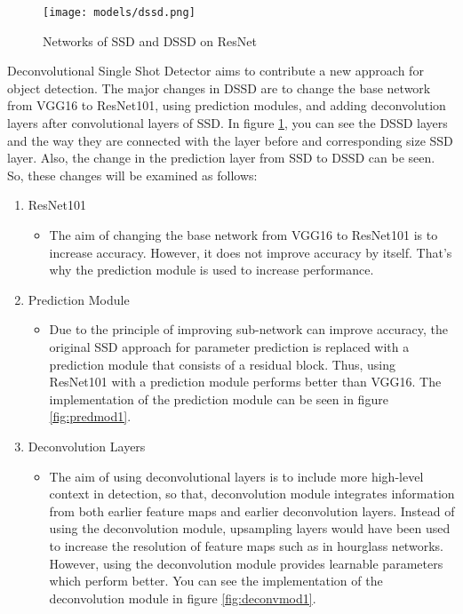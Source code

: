 \documentclass{article}
\begin{document}
\setlength{\parindent}{6ex}

\begin{figure}
    \centering
    \texttt{[image: models/dssd.png]}
    \caption{Networks of SSD and DSSD on ResNet}
    \label{fig:dssd1}
\end{figure}

\indent

Deconvolutional Single Shot Detector \cite{dssdcite} aims to contribute a new approach for object 
detection. The major changes in DSSD are to change the base network from VGG16 to 
ResNet101, using prediction modules, and adding deconvolution layers after convolutional 
layers of SSD. In figure \ref{fig:dssd1}, you can see the DSSD layers and the way they are 
connected with the layer before and corresponding size SSD layer. Also, the change in 
the prediction layer from SSD to DSSD can be seen. So, these changes will be examined as follows: 
\begin{enumerate}
    \item ResNet101
    \begin{itemize}
        \item The aim of changing the base network from VGG16 to ResNet101 is to 
increase accuracy. However, it does not improve accuracy by itself. That's why 
the prediction module is used to increase performance.
    \end{itemize}
    \item Prediction Module
    \begin{itemize}
        \item Due to the principle of improving sub-network can improve accuracy, 
the original SSD approach for parameter prediction is replaced with a prediction module that 
consists of a residual block. Thus, using ResNet101 with a prediction module performs 
better than VGG16. The implementation of the prediction module can be seen in figure 
\ref{fig:predmod1}.
    \end{itemize}
    \item Deconvolution Layers
    \begin{itemize}
        \item The aim of using deconvolutional layers is to include more high-level 
context in detection, so that, deconvolution module integrates information from both 
earlier feature maps and earlier deconvolution layers. Instead of using the deconvolution 
module, upsampling layers would have been used to increase the resolution of feature 
maps such as in hourglass networks. However, using the deconvolution module provides 
learnable parameters which perform better. You can see the implementation of 
the deconvolution module in figure \ref{fig:deconvmod1}.
    \end{itemize}
\end{enumerate}
\end{document}
